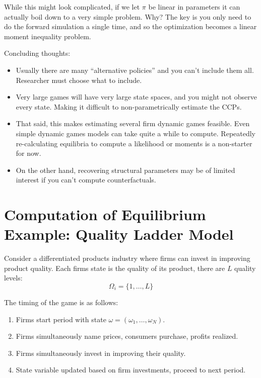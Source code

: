 \documentclass[twoside]{article}
\begin{document}
While this might look complicated, if we let $\pi$ be linear in parameters it can actually boil down to a very simple problem. Why? The key is you only need to do the forward simulation a single time, and so the optimization becomes a linear moment inequality problem. 

Concluding thoughts: 
\begin{itemize} 

\item Usually there are many ``alternative policies'' and you can't include them all. Researcher must choose what to include. 

\item Very large games will have very large state spaces, and you might not observe every state. Making it difficult to non-parametrically estimate the CCPs. 

\item That said, this makes estimating several firm dynamic games feasible.  Even simple dynamic games models can take quite a while to compute. Repeatedly re-calculating equilibria to compute a likelihood or moments is a non-starter for now. 

\item On the other hand, recovering structural parameters may be of limited interest if you can't compute counterfactuals. 

\end{itemize}

\section{Computation of Equilibrium Example: Quality Ladder Model}

Consider a differentiated products industry where firms can invest in improving product quality. Each firms state is the quality of its product, there are $L$ quality levels:
$$\Omega_i = \{ 1, \ldots, L \}$$

The timing of the game is as follows: 
\begin{enumerate}
\item Firms start period with state $\omega = (\omega_1, \ldots, \omega_N)$.
\item Firms simultaneously name prices, consumers purchase, profits realized. 
\item Firms simultaneously invest in improving their quality. 
\item State variable updated based on firm investments, proceed to next period.
\end{enumerate}
\end{document}
